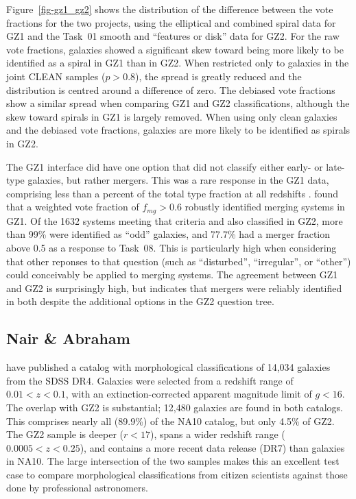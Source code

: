 \documentclass[useAMS,usenatbib]{mn2e}
\begin{document}
Figure~\ref{fig-gz1_gz2} shows the distribution of the difference between the vote fractions for the two projects, using the elliptical and combined spiral data for GZ1 and the Task~01 smooth and ``features or disk'' data for GZ2. For the raw vote fractions, galaxies showed a significant skew toward being more likely to be identified as a spiral in GZ1 than in GZ2. When restricted only to galaxies in the joint CLEAN samples ($p>0.8$), the spread is greatly reduced and the distribution is centred around a difference of zero. The debiased vote fractions show a similar spread when comparing GZ1 and GZ2 classifications, although the skew toward spirals in GZ1 is largely removed. When using only clean galaxies and the debiased vote fractions, galaxies are more likely to be identified as spirals in GZ2. 

The GZ1 interface did have one option that did not classify either early- or late-type galaxies, but rather mergers. This was a rare response in the GZ1 data, comprising less than a percent of the total type fraction at all redshifts \citep{bam09}. \citet{dar10a} found that a weighted vote fraction of $f_{mg} > 0.6$ robustly identified merging systems in GZ1. Of the 1632 systems meeting that criteria and also classified in GZ2, more than 99\% were identified as ``odd'' galaxies, and 77.7\% had a merger fraction above 0.5 as a response to Task~08. This is particularly high when considering that other reponses to that question (such as ``disturbed'', ``irregular'', or ``other'') could conceivably be applied to merging systems. The agreement between GZ1 and GZ2 is surprisingly high, but indicates that mergers were reliably identified in both despite the additional options in the GZ2 question tree. 

\subsection{Nair \& Abraham}

\citet[][hereafter NA10]{nai10} have published a catalog with morphological classifications of 14,034 galaxies from the SDSS DR4. Galaxies were selected from a redshift range of $0.01<z<0.1$, with an extinction-corrected apparent magnitude limit of $g<16$. The overlap with GZ2 is substantial; 12,480 galaxies are found in both catalogs. This comprises nearly all (89.9\%) of the NA10 catalog, but only 4.5\% of GZ2. The GZ2 sample is deeper ($r<17$), spans a wider redshift range ($0.0005<z<0.25$), and contains a more recent data release (DR7) than galaxies in NA10. The large intersection of the two samples makes this an excellent test case to compare morphological classifications from citizen scientists against those done by professional astronomers.  
\end{document}
